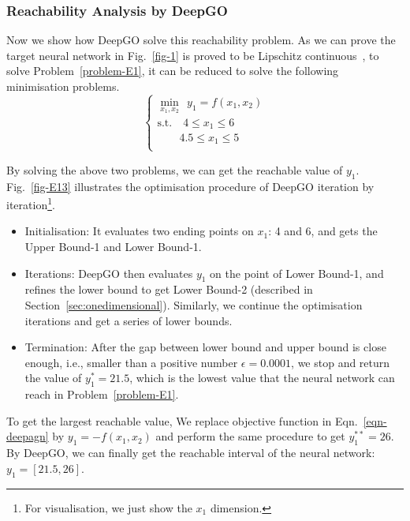 \subsubsection{Reachability Analysis by DeepGO}


Now we show how DeepGO solve this reachability problem. As we can prove the target neural network in Fig.~\ref{fig-1} is proved to be Lipschitz continuous~\cite{szegedy2014intriguing,RHK2018}, to solve Problem~\ref{problem-E1}, it can be reduced to solve the following minimisation problems.
\begin{equation}\label{eqn-deepagn}
   \begin{cases}
        \min_{x_1,x_2}~~y_1 = f(x_1,x_2)\\
        \text{s.t.} \quad 4\leq x_1 \leq 6\\
        \qquad 4.5\leq x_1 \leq 5\\
  \end{cases}
\end{equation}

By solving the above two problems, we can get the reachable value of $y_1$. Fig.~\ref{fig-E13} illustrates the optimisation procedure of DeepGO iteration by iteration\footnote{For visualisation, we just show the $x_1$ dimension.}.

\begin{itemize}
    \item Initialisation: It evaluates two ending points on $x_1$: 4 and 6, and gets the Upper Bound-1 and Lower Bound-1.
    \item Iterations: DeepGO then evaluates $y_1$ on the point of Lower Bound-1, and refines the lower bound to get Lower Bound-2 (described in Section~\ref{sec:onedimensional}). Similarly, we continue the optimisation iterations and get a series of lower bounds.
    \item Termination: After the gap between lower bound and upper bound is close enough, i.e., smaller than a positive number $\epsilon = 0.0001$, we stop and return the value of $y_1^* = 21.5$, which is the lowest value that the neural network can reach in Problem~\ref{problem-E1}.
\end{itemize}

To get the largest reachable value, We replace objective function in Eqn.~\ref{eqn-deepagn} by $y_1 = - f(x_1,x_2)$ and perform the same procedure to get $y_1^{**} = 26$. By DeepGO, we can finally get the reachable interval of the neural network: $y_1 = [21.5, 26]$. 

